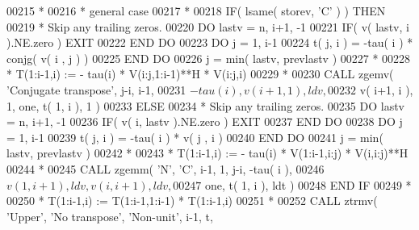 \begin{DoxyCode}
00215 \textcolor{comment}{*}
00216 \textcolor{comment}{*              general case}
00217 \textcolor{comment}{*}
00218                \textcolor{keywordflow}{IF}( lsame( storev, \textcolor{stringliteral}{'C'} ) ) \textcolor{keywordflow}{THEN}
00219 \textcolor{comment}{*                 Skip any trailing zeros.}
00220                   \textcolor{keywordflow}{DO} lastv = n, i+1, -1
00221                      \textcolor{keywordflow}{IF}( v( lastv, i ).NE.zero ) \textcolor{keywordflow}{EXIT}
00222 \textcolor{keywordflow}{                  END DO}
00223                   \textcolor{keywordflow}{DO} j = 1, i-1
00224                      t( j, i ) = -tau( i ) * conjg( v( i , j ) )
00225 \textcolor{keywordflow}{                  END DO}                     
00226                   j = min( lastv, prevlastv )
00227 \textcolor{comment}{*}
00228 \textcolor{comment}{*                 T(1:i-1,i) := - tau(i) * V(i:j,1:i-1)**H * V(i:j,i)}
00229 \textcolor{comment}{*}
00230                   \textcolor{keyword}{CALL }zgemv( \textcolor{stringliteral}{'Conjugate transpose'}, j-i, i-1,
00231      $                        -tau( i ), v( i+1, 1 ), ldv, 
00232      $                        v( i+1, i ), 1, one, t( 1, i ), 1 )
00233                \textcolor{keywordflow}{ELSE}
00234 \textcolor{comment}{*                 Skip any trailing zeros.}
00235                   \textcolor{keywordflow}{DO} lastv = n, i+1, -1
00236                      \textcolor{keywordflow}{IF}( v( i, lastv ).NE.zero ) \textcolor{keywordflow}{EXIT}
00237 \textcolor{keywordflow}{                  END DO}
00238                   \textcolor{keywordflow}{DO} j = 1, i-1
00239                      t( j, i ) = -tau( i ) * v( j , i )
00240 \textcolor{keywordflow}{                  END DO}                     
00241                   j = min( lastv, prevlastv )
00242 \textcolor{comment}{*}
00243 \textcolor{comment}{*                 T(1:i-1,i) := - tau(i) * V(1:i-1,i:j) * V(i,i:j)**H}
00244 \textcolor{comment}{*}
00245                   \textcolor{keyword}{CALL }zgemm( \textcolor{stringliteral}{'N'}, \textcolor{stringliteral}{'C'}, i-1, 1, j-i, -tau( i ),
00246      $                        v( 1, i+1 ), ldv, v( i, i+1 ), ldv,
00247      $                        one, t( 1, i ), ldt )                  
00248 \textcolor{keywordflow}{               END IF}
00249 \textcolor{comment}{*}
00250 \textcolor{comment}{*              T(1:i-1,i) := T(1:i-1,1:i-1) * T(1:i-1,i)}
00251 \textcolor{comment}{*}
00252                \textcolor{keyword}{CALL }ztrmv( \textcolor{stringliteral}{'Upper'}, \textcolor{stringliteral}{'No transpose'}, \textcolor{stringliteral}{'Non-unit'}, i-1, t,

\end{DoxyCode}
